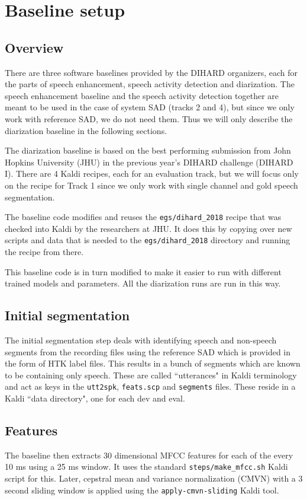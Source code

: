 \chapter{Baseline setup}

\section{Overview}
There are three software baselines provided by the DIHARD organizers, each for the parts of speech enhancement, speech activity detection and diarization. The speech enhancement baseline and the speech activity detection together are meant to be used in the case of system SAD (tracks 2 and 4), but since we only work with reference SAD, we do not need them. Thus we will only describe the diarization baseline in the following sections.

The diarization baseline is based on the best performing submission from John Hopkins University (JHU) in the previous year's DIHARD challenge (DIHARD I). There are 4 Kaldi recipes, each for an evaluation track, but we will focus only on the recipe for Track 1 since we only work with single channel and gold speech segmentation.

The baseline code modifies and reuses the \texttt{egs/dihard\_2018} recipe that was checked into Kaldi by the researchers at JHU. It does this by copying over new scripts and data that is needed to the \texttt{egs/dihard\_2018} directory and running the recipe from there.

This baseline code is in turn modified to make it easier to run with different trained models and parameters. All the diarization runs are run in this way.

\section{Initial segmentation}
The initial segmentation step deals with identifying speech and non-speech segments from the recording files using the reference SAD which is provided in the form of HTK label files. This results in a bunch of segments which are known to be containing only speech. These are called ``utterances" in Kaldi terminology and act as keys in the \texttt{utt2spk}, \texttt{feats.scp} and \texttt{segments} files. These reside in a Kaldi ``data directory", one for each dev and eval.

\section{Features}
The baseline then extracts 30 dimensional MFCC features for each of the every 10 ms using a 25 ms window. It uses the standard \texttt{steps/make\_mfcc.sh} Kaldi script for this. Later, cepstral mean and variance normalization (CMVN) with a 3 second sliding window is applied using the \texttt{apply-cmvn-sliding} Kaldi tool.

